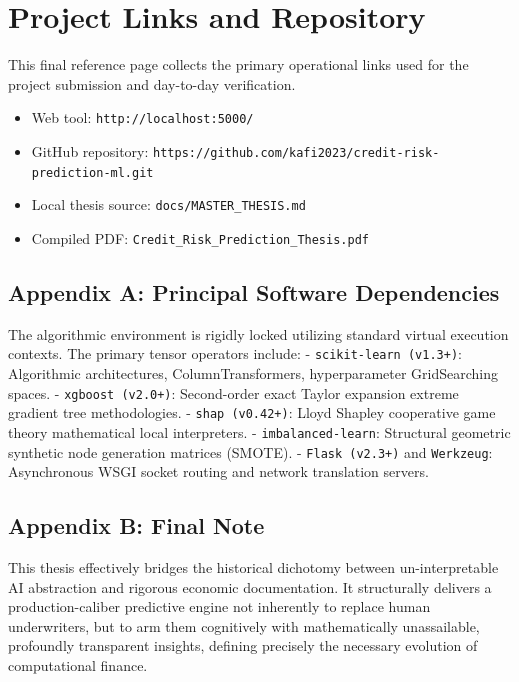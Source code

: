 \hypertarget{project-links-and-repository}{%
\chapter{Project Links and
Repository}\label{project-links-and-repository}}

This final reference page collects the primary operational links used
for the project submission and day-to-day verification.

\begin{itemize}
\tightlist
\item
  Web tool: \texttt{http://localhost:5000/}
\item
  GitHub repository:
  \texttt{https://github.com/kafi2023/credit-risk-prediction-ml.git}
\item
  Local thesis source: \texttt{docs/MASTER\_THESIS.md}
\item
  Compiled PDF: \texttt{Credit\_Risk\_Prediction\_Thesis.pdf}
\end{itemize}

\hypertarget{appendix-a-principal-software-dependencies}{%
\section{Appendix A: Principal Software
Dependencies}\label{appendix-a-principal-software-dependencies}}

The algorithmic environment is rigidly locked utilizing standard virtual
execution contexts. The primary tensor operators include: -
\texttt{scikit-learn\ (v1.3+)}: Algorithmic architectures,
ColumnTransformers, hyperparameter GridSearching spaces. -
\texttt{xgboost\ (v2.0+)}: Second-order exact Taylor expansion extreme
gradient tree methodologies. - \texttt{shap\ (v0.42+)}: Lloyd Shapley
cooperative game theory mathematical local interpreters. -
\texttt{imbalanced-learn}: Structural geometric synthetic node
generation matrices (SMOTE). - \texttt{Flask\ (v2.3+)} and
\texttt{Werkzeug}: Asynchronous WSGI socket routing and network
translation servers.

\hypertarget{appendix-b-final-note}{%
\section{Appendix B: Final Note}\label{appendix-b-final-note}}

This thesis effectively bridges the historical dichotomy between
un-interpretable AI abstraction and rigorous economic documentation. It
structurally delivers a production-caliber predictive engine not
inherently to replace human underwriters, but to arm them cognitively
with mathematically unassailable, profoundly transparent insights,
defining precisely the necessary evolution of computational finance.
